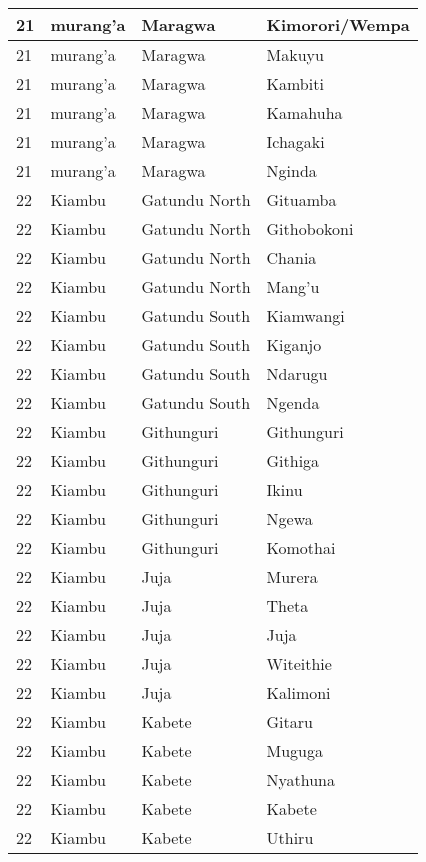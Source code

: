 \begin{table}[!ht]
\begin{tabular}{|l|l|l|l|}
        21 & murang’a & Maragwa & Kimorori/Wempa \\ \hline
        21 & murang’a & Maragwa & Makuyu \\ \hline
        21 & murang’a & Maragwa & Kambiti \\ \hline
        21 & murang’a & Maragwa & Kamahuha \\ \hline
        21 & murang’a & Maragwa & Ichagaki \\ \hline
        21 & murang’a & Maragwa & Nginda \\ \hline
        22 & Kiambu & Gatundu North & Gituamba \\ \hline
        22 & Kiambu & Gatundu North & Githobokoni \\ \hline
        22 & Kiambu & Gatundu North & Chania \\ \hline
        22 & Kiambu & Gatundu North & Mang’u \\ \hline
        22 & Kiambu & Gatundu South & Kiamwangi \\ \hline
        22 & Kiambu & Gatundu South & Kiganjo \\ \hline
        22 & Kiambu & Gatundu South & Ndarugu \\ \hline
        22 & Kiambu & Gatundu South & Ngenda \\ \hline
        22 & Kiambu & Githunguri & Githunguri \\ \hline
        22 & Kiambu & Githunguri & Githiga \\ \hline
        22 & Kiambu & Githunguri & Ikinu \\ \hline
        22 & Kiambu & Githunguri & Ngewa \\ \hline
        22 & Kiambu & Githunguri & Komothai \\ \hline
        22 & Kiambu & Juja & Murera \\ \hline
        22 & Kiambu & Juja & Theta \\ \hline
        22 & Kiambu & Juja & Juja \\ \hline
        22 & Kiambu & Juja & Witeithie \\ \hline
        22 & Kiambu & Juja & Kalimoni \\ \hline
        22 & Kiambu & Kabete & Gitaru \\ \hline
        22 & Kiambu & Kabete & Muguga \\ \hline
        22 & Kiambu & Kabete & Nyathuna \\ \hline
        22 & Kiambu & Kabete & Kabete \\ \hline
        22 & Kiambu & Kabete & Uthiru \\ \hline

\end{tabular}
\end{table}
